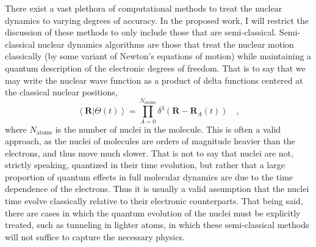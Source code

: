 \documentclass[12pt]{article}
\newcommand{\inner}[2]{\left\langle #1 \left\vert\right. #2 \right\rangle}            %
\newcommand*\vc[1]{\boldsymbol{#1}}
\begin{document}
There exist a vast plethora of computational methods to treat the nuclear
dynamics to varying degrees of accuracy. In the proposed work, I will restrict
the discussion of these methods to only include those that are semi-classical.
Semi-classical nuclear dynamics algorithms are those that treat the nuclear
motion classically (by some variant of Newton's equations of motion) while
maintaining a quantum description of the electronic degrees of freedom. That is
to say that we may write the nuclear wave function as a product of delta
functions centered at the classical nuclear positions,
\begin{equation}
\inner{\vc{R}}{\Theta (t)} = 
  \prod_{A = 0}^{N_\mathrm{atoms}} \delta^3(\vc{R} - \vc{R}_A(t))
  \quad,
  \label{eq:ClassicalNuclei}
\end{equation}
where $N_\mathrm{atoms}$ is the number of nuclei in the molecule.  This is
often a valid approach, as the nuclei of molecules are orders of magnitude
heavier than the electrons, and thus move much slower. That is not to say that
nuclei are not, strictly speaking, quantized in their time evolution, but
rather that a large proportion of quantum effects in full molecular dynamics
are due to the time dependence of the electrons. Thus it is usually a valid
assumption that the nuclei time evolve classically relative to their electronic
counterparts. That being said, there are cases in which the quantum evolution
of the nuclei must be explicitly treated, such as tunneling in lighter atoms,
in which these semi-classical methods will not suffice to capture the necessary
physics.
\end{document}
